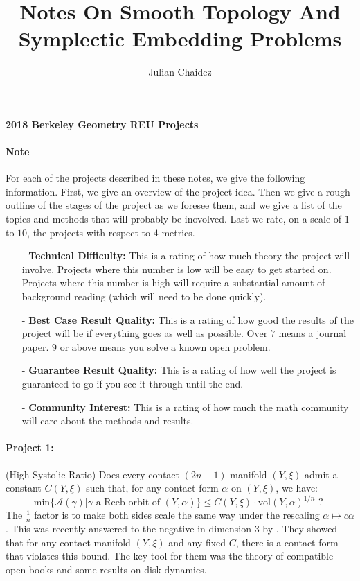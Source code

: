 \documentclass[12pt]{article}
\title{Notes On Smooth Topology And Symplectic Embedding Problems}
\author{Julian Chaidez}
\numberwithin{equation}{section}
\theoremstyle{definition}
\begin{document}
\begin{center}
{\bf 2018 Berkeley Geometry REU Projects}\\
\end{center}

\paragraph{Note} For each of the projects described in these notes, we give the following information. First, we give an overview of the project idea. Then we give a rough outline of the stages of the project as we foresee them, and we give a list of the topics and methods that will probably be inovolved. Last we rate, on a scale of $1$ to $10$, the projects with respect to $4$ metrics.

\begin{itemize}
	\item[-] {\bf Technical Difficulty:} This is a rating of how much theory the project will involve. Projects where this number is low will be easy to get started on. Projects where this number is high will require a substantial amount of background reading (which will need to be done quickly). 
	\item[-] {\bf Best Case Result Quality:} This is a rating of how good the results of the project will be if everything goes as well as possible. Over $7$ means a journal paper. $9$ or above means you solve a known open problem.
	\item[-] {\bf Guarantee Result Quality:} This is a rating of how well the project is guaranteed to go if you see it through until the end. 
	\item[-] {\bf Community Interest:} This is a rating of how much the math community will care about the methods and results. 
\end{itemize}

\paragraph{Project 1:} (High Systolic Ratio) Does every contact $(2n-1)$-manifold $(Y,\xi)$ admit a constant $C(Y,\xi)$ such that, for any contact form $\alpha$ on $(Y,\xi)$, we have:
\[
\text{min}\{\mathcal{A}(\gamma)|\gamma \text{ a Reeb orbit of }(Y,\alpha)\} \le C(Y,\xi) \cdot \text{vol}(Y,\alpha)^{1/n} \text{ ? }
\]
The $\frac{1}{n}$ factor is to make both sides scale the same way under the rescaling $\alpha \mapsto c\alpha$. This was recently answered to the negative in dimension $3$ by \cite{abhs2017a}. They showed that for any contact manifold $(Y,\xi)$ and any fixed $C$, there is a contact form that violates this bound. The key tool for them was the theory of compatible open books and some results on disk dynamics.
\end{document}
